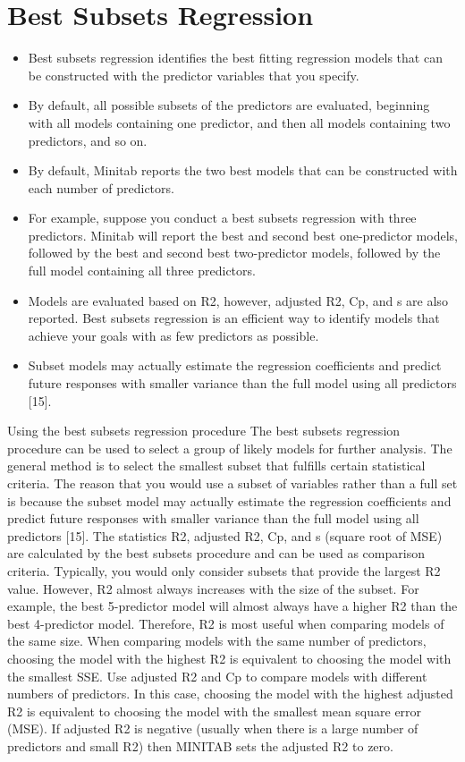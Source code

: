 \documentclass[]{report}
\begin{document}
\section{Best Subsets Regression}
\begin{itemize}
	\item Best subsets regression identifies the best fitting regression models that can be constructed with
	the predictor variables that you specify.
	\item  By default, all possible subsets of the predictors are
	evaluated, beginning with all models containing one predictor, and then all models containing
	two predictors, and so on. 
	\item By default, Minitab reports the two best models that can be
	constructed with each number of predictors.
\item For example, suppose you conduct a best subsets regression with three predictors. Minitab will
	report the best and second best one-predictor models, followed by the best and second best
	two-predictor models, followed by the full model containing all three predictors.
\item Models are evaluated based on R2, however, adjusted R2, Cp, and s are also reported.
	Best subsets regression is an efficient way to identify models that achieve your goals with as few
	predictors as possible. 
	\item Subset models may actually estimate the regression coefficients and
	predict future responses with smaller variance than the full model using all predictors [15].
\end{itemize}

\newpage
Using the best subsets regression procedure
The best subsets regression procedure can be used to select a group of likely models for further
analysis. The general method is to select the smallest subset that fulfills certain statistical criteria.
The reason that you would use a subset of variables rather than a full set is because the subset
model may actually estimate the regression coefficients and predict future responses with smaller
variance than the full model using all predictors [15].
The statistics R2, adjusted R2, Cp, and s (square root of MSE) are calculated by the best subsets
procedure and can be used as comparison criteria.
Typically, you would only consider subsets that provide the largest R2 value. However, R2 almost
always increases with the size of the subset. For example, the best 5-predictor model will almost
always have a higher R2 than the best 4-predictor model. Therefore, R2 is most useful when
comparing models of the same size. When comparing models with the same number of
predictors, choosing the model with the highest R2 is equivalent to choosing the model with the
smallest SSE.
Use adjusted R2 and Cp to compare models with different numbers of predictors. In this case,
choosing the model with the highest adjusted R2 is equivalent to choosing the model with the
smallest mean square error (MSE). If adjusted R2 is negative (usually when there is a large
number of predictors and small R2) then MINITAB sets the adjusted R2 to zero.
\end{document}
